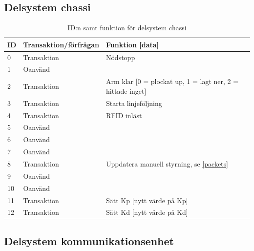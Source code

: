 \subsection{Delsystem chassi}

\begin{table}[H]
\centering
\label{callbacks-chassi}
\begin{tabularx}{\textwidth}{|l|l|X|}
\hline
\textbf{ID} & \textbf{Transaktion/förfrågan} & \textbf{Funktion [data]} \\ \hline
0 & Transaktion & Nödstopp \\ \hline
1 & Oanvänd & \\ \hline
2 & Transaktion & Arm klar [0 = plockat up, 1 = lagt ner, 2 = hittade inget] \\ \hline
3 & Transaktion & Starta linjeföljning \\ \hline
4 & Transaktion & RFID inläst \\ \hline
5 & Oanvänd & \\ \hline
6 & Oanvänd & \\ \hline
7 & Oanvänd & \\ \hline
8 & Transaktion & Uppdatera manuell styrning, se \ref{packets}\\ \hline
9 & Oanvänd & \\ \hline
10 & Oanvänd & \\ \hline
11 & Transaktion & Sätt Kp [nytt värde på Kp] \\ \hline
12 & Transaktion & Sätt Kd [nytt värde på Kd] \\ \hline
\end{tabularx}
\caption{ID:n samt funktion för delsystem chassi}
\end{table}

\subsection{Delsystem kommunikationsenhet}

